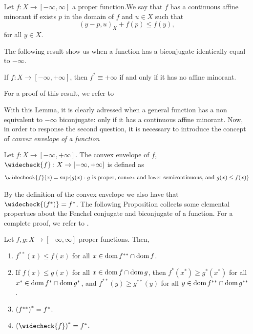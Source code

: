  \begin{definition}
     Let $f:X\to[-\infty,\infty]$ a proper function.We say that $f$ has a continuous affine minorant if exists $p$ in the domain of $f$ and $u\in X$ such that 
     \[
     (y-p,u)_{X}+f(p)\le f(y),
     \]
     for all $y\in X$.
 \end{definition}
The following result show us when a function has a biconjugate identically equal to $-\infty$.
\begin{lemma}
    If $f:X\to [-\infty, +\infty]$, then $f^{*}\equiv +\infty$ if and only if it has no affine minorant.
\end{lemma}
For a proof of this result, we refer to \cite[Proposition 13.12]{combettes}

With this Lemma, it is clearly adressed when a general function has a non equivalent to $-\infty$ biconjugate: only if it has a continuous affine minorant. Now, in order to response the second question, it is necessary to introduce the concept of \textit{convex envelope of a function}
\begin{definition}
    Let $f:X\to [-\infty, +\infty]$. The convex envelope of $f$, $\widecheck{f}:X\to [-\infty, +\infty]$ is defined as
    \[
    \widecheck{f}(x)=\sup\{g(x): g \mbox{ is proper, convex and lower semicontinuous, and }g(x)\le f(x)\}
    \]
\end{definition}
 
 
 By the definition of the convex envelope we also have that $\widecheck{(f^*)}=f^*$. The following Proposition collects some elemental propertues about the Fenchel conjugate and biconjugate of a function. For a complete proof, we refer to \cite[Proposition 13.16]{combettes}.
 \begin{proposition}\label{th:conj_prop}
     Let $f,g:X\to [-\infty, \infty]$ proper functions. Then,
     \begin{enumerate}
         \item $f^{**}(x) \le f(x)$ for all $x\in \operatorname{dom}{f^{**}}\cap\operatorname{dom}{f}$.
         \item If $f(x)\le g(x)$ for all $x\in \operatorname{dom}{f}\cap\operatorname{dom}{g}$, then $f^{*}(x^*)\ge g^{*}(x^*)$ for all $x^*\in \operatorname{dom}{f^*}\cap\operatorname{dom}{g^*}$, and $f^{**}(y)\ge g^{**}(y)$ for all $y\in \operatorname{dom}{f^{**}}\cap\operatorname{dom}{g^{**}}$.
         \item $\left(f^{**}\right)^*=f^*$.
         \item $\l(\widecheck{f}\r)^*=f^*$.
     \end{enumerate}
 \end{proposition}
 

